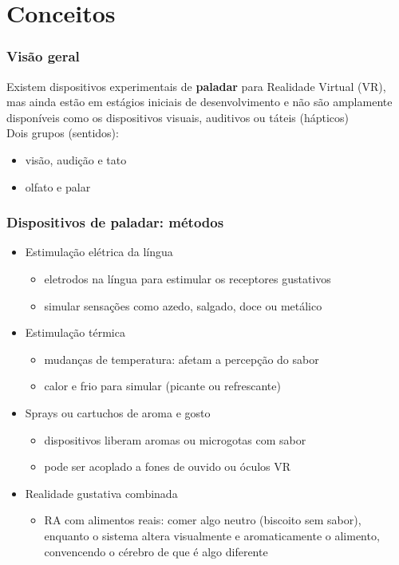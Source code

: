 \documentclass{beamer}
\begin{document}
\section{Conceitos}
\begin{frame}
  \frametitle{Visão geral}
  Existem dispositivos experimentais de \textbf{paladar} para Realidade Virtual (VR), mas ainda estão em estágios iniciais de desenvolvimento e não são amplamente disponíveis como os dispositivos visuais, auditivos ou táteis (hápticos) \\
  \vspace{\baselineskip}
  Dois grupos (sentidos):
  \begin{itemize}
  \item visão, audição e tato
  \item olfato e palar
  \end{itemize}
\end{frame}

\begin{frame}
  \frametitle{Dispositivos de paladar: métodos}
  \begin{itemize}
    \item Estimulação elétrica da língua
    \begin{itemize}
      \item eletrodos na língua para estimular os receptores gustativos
      \item simular sensações como azedo, salgado, doce ou metálico
    \end{itemize}
    \item Estimulação térmica
    \begin{itemize}
      \item mudanças de temperatura: afetam a percepção do sabor
      \item calor e frio para simular (picante ou refrescante)  
    \end{itemize}
    \item Sprays ou cartuchos de aroma e gosto
    \begin{itemize}
      \item dispositivos liberam aromas ou microgotas com sabor
      \item pode ser acoplado a fones de ouvido ou óculos VR
    \end{itemize}
    \item Realidade gustativa combinada
    \begin{itemize}
      \item RA com alimentos reais: comer algo neutro (biscoito sem sabor), enquanto o sistema altera visualmente e aromaticamente o alimento, convencendo o cérebro de que é algo diferente
    \end{itemize}
  \end{itemize}
\end{frame}
\end{document}
